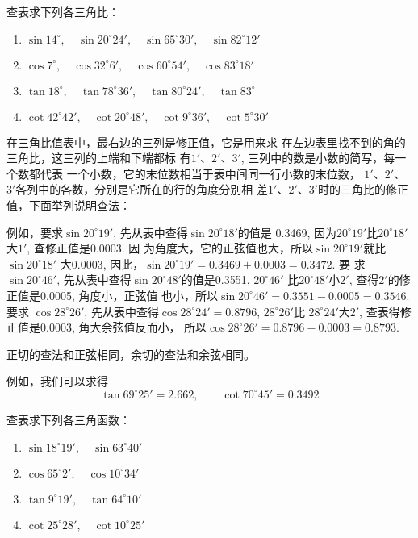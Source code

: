 \begin{ex}
    查表求下列各三角比：
\begin{enumerate}
    \item $\sin14^{\circ},\quad \sin20^{\circ}24',\quad \sin65^{\circ}30',\quad \sin82^{\circ}12'$
    \item $\cos7^{\circ},\quad  \cos32^{\circ}6',\quad  \cos60^{\circ}54',\quad \cos83^{\circ}18'$
    \item $\tan 18^{\circ},\quad  \tan 78^{\circ}36',\quad  \tan 80^{\circ}24',\quad  \tan 83^{\circ}$
    \item $\cot 42^{\circ}42',\quad   \cot20^{\circ}48', \quad  \cot9^{\circ}36', \quad  \cot 5^{\circ}30'$
\end{enumerate}
\end{ex}

在三角比值表中，最右边的三列是修正值，它是用来求
在左边表里找不到的角的三角比，这三列的上端和下端都标
有$1'$、$2'$、$3'$, 三列中的数是小数的简写，每一个数都代表
一个小数，它的末位数相当于表中间同一行小数的末位数，
$1'$、$2'$、$3'$各列中的各数，分别是它所在的行的角度分别相
差$1'$、$2'$、$3'$时的三角比的修正值，下面举列说明查法：

例如，要求$\sin20^{\circ}19'$, 先从表中查得$\sin20^{\circ}18'$的值是
0.3469, 因为$20^{\circ}19'$比$20^{\circ}18'$大$1'$, 查修正值是0.0003. 因
为角度大，它的正弦值也大，所以$\sin20^{\circ}19'$就比$\sin20^{\circ}18'$
大0.0003, 因此，$\sin20^{\circ}19'=0.3469+0.0003=0.3472$. 要
求$\sin20^{\circ}46'$, 先从表中查得$\sin20^{\circ}48'$的值是0.3551, $20^{\circ}46'$
比$20^{\circ}48'$小$2'$, 查得$2'$的修正值是0.0005, 角度小，正弦值
也小，所以$\sin20^{\circ}46'=0.3551-0.0005=0.3546$. 要求
$\cos28^{\circ}26'$, 先从表中查得$\cos28^{\circ}24'=0.8796$, $28^{\circ}26'$比
$28^{\circ}24'$大$2'$, 查表得修正值是0.0003, 角大余弦值反而小，
所以$\cos28^{\circ}26'=0.8796-0.0003=0.8793$. 

正切的查法和正弦相同，余切的查法和余弦相同。

例如，我们可以求得
\[\tan 69^{\circ}25'=2.662,\qquad \cot 70^{\circ}45'=0.3492\]

\begin{ex}
    查表求下列各三角函数：
\begin{multicols}{2}
    \begin{enumerate}
        \item $\sin18^{\circ}19',\quad  \sin63^{\circ}40'$
        \item $\cos65^{\circ}2',\quad  \cos10^{\circ}34'$
        \item $\tan 9^{\circ}19',\quad  \tan64^{\circ}10'$
        \item $\cot25^{\circ}28',\quad  \cot10^{\circ}25'$
    \end{enumerate}
\end{multicols}
\end{ex}

